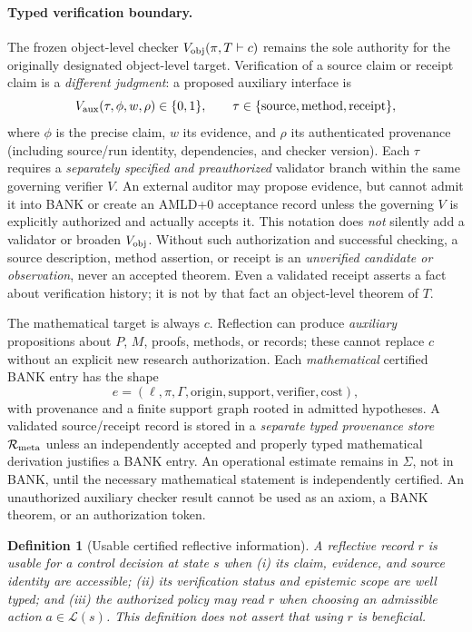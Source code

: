 \documentclass[11pt,letterpaper]{article}
\newtheorem{definition}{Definition}[section]
\begin{document}
\paragraph{Typed verification boundary.} The frozen object-level checker $V_{\rm obj}(\pi,T\vdash c)$ remains the sole authority for the originally designated object-level target. Verification of a source claim or receipt claim is a \emph{different judgment}: a proposed auxiliary interface is
\[
V_{\rm aux}(\tau,\phi,w,\rho)\in\{0,1\},\qquad
\tau\in\{\text{source},\text{method},\text{receipt}\},
\]
where $\phi$ is the precise claim, $w$ its evidence, and $\rho$ its authenticated provenance (including source/run identity, dependencies, and checker version). Each $\tau$ requires a \emph{separately specified and preauthorized} validator branch within the same governing verifier $V$. An external auditor may propose evidence, but cannot admit it into BANK or create an AMLD+0 acceptance record unless the governing $V$ is explicitly authorized and actually accepts it. This notation does \emph{not} silently add a validator or broaden $V_{\rm obj}$. Without such authorization and successful checking, a source description, method assertion, or receipt is an \emph{unverified candidate or observation}, never an accepted theorem. Even a validated receipt asserts a fact about verification history; it is not by that fact an object-level theorem of $T$.

The mathematical target is always $c$. Reflection can produce \emph{auxiliary} propositions about $P$, $M$, proofs, methods, or records; these cannot replace $c$ without an explicit new research authorization. Each \emph{mathematical} certified BANK entry has the shape
\[
e=(\ell,\pi,\Gamma,\text{origin},\text{support},\text{verifier},\text{cost}),
\]
with provenance and a finite support graph rooted in admitted hypotheses. A validated source/receipt record is stored in a \emph{separate typed provenance store} $\mathcal R_{\rm meta}$ unless an independently accepted and properly typed mathematical derivation justifies a BANK entry. An operational estimate remains in $\Sigma$, not in BANK, until the necessary mathematical statement is independently certified. An unauthorized auxiliary checker result cannot be used as an axiom, a BANK theorem, or an authorization token.

\begin{definition}[Usable certified reflective information]
A reflective record $r$ is \emph{usable for a control decision} at state $s$ when (i) its claim, evidence, and source identity are accessible; (ii) its verification status and epistemic scope are well typed; and (iii) the authorized policy may read $r$ when choosing an admissible action $a\in\mathcal L(s)$. This definition does not assert that using $r$ is beneficial.
\end{definition}
\end{document}
